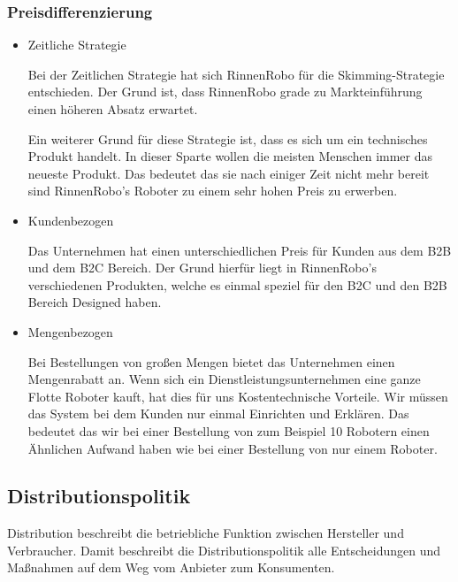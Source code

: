 \subsubsection{Preisdifferenzierung} \label{Preisdiff}
    \begin{itemize}
        \item Zeitliche Strategie
            
            Bei der Zeitlichen Strategie hat sich RinnenRobo für die Skimming-Strategie entschieden. Der Grund ist, dass 
            RinnenRobo grade zu Markteinführung einen höheren Absatz erwartet.

            Ein weiterer Grund für diese Strategie ist, dass es sich um ein technisches Produkt handelt. In dieser
            Sparte wollen die meisten Menschen immer das neueste Produkt. Das bedeutet das sie nach einiger Zeit 
            nicht mehr bereit sind RinnenRobo's Roboter zu einem sehr hohen Preis zu erwerben.

        \item Kundenbezogen

            Das Unternehmen hat einen unterschiedlichen Preis für Kunden aus dem B2B und dem B2C Bereich. Der Grund 
            hierfür liegt in RinnenRobo's verschiedenen Produkten, welche es einmal speziel für den B2C und den B2B
            Bereich Designed haben.

        \item Mengenbezogen
        
            Bei Bestellungen von großen Mengen bietet das Unternehmen einen Mengenrabatt an. Wenn sich ein 
            Dienstleistungsunternehmen eine ganze Flotte Roboter kauft, hat dies für uns Kostentechnische Vorteile.
            Wir müssen das System bei dem Kunden nur einmal Einrichten und Erklären. Das bedeutet das wir bei einer 
            Bestellung von zum Beispiel 10 Robotern einen Ähnlichen Aufwand haben wie bei einer Bestellung von nur einem 
            Roboter.
        \end{itemize}

        \subsection{Distributionspolitik} \label{distro}
        Distribution beschreibt die betriebliche Funktion zwischen Hersteller und Verbraucher. Damit beschreibt die
        Distributionspolitik alle Entscheidungen und Maßnahmen auf dem Weg vom Anbieter zum Konsumenten.
    
